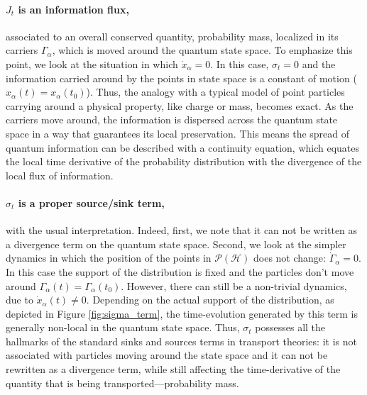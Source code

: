\documentclass[%
 reprint,
 superscriptaddress,
 aps,
 pra,
]{revtex4-2}
\newcommand{\PH}{\mathcal{P}(\mathcal{H})}
\theoremstyle{definition}
\begin{document}
\paragraph*{$J_t$ is an information flux,} associated to an overall conserved quantity, probability mass, localized in its carriers $\Gamma_\alpha$, which 
is moved around the quantum state space. To emphasize this point, we look at the situation in which $\dot{x}_\alpha = 0$. 
In this case, $\sigma_t=0$ and the information carried around by the points in state space is a constant of motion 
($x_\alpha(t)= x_\alpha(t_0)$). Thus, the analogy with a typical model of point particles carrying around a physical property, 
like charge or mass, becomes exact. As the carriers move around, the information is dispersed across the quantum 
state space in a way that guarantees its local preservation. This means the spread of quantum information can be described 
with a continuity equation, which equates the local time derivative of the probability distribution with the divergence of the 
local flux of information.

\paragraph*{$\sigma_t$ is a proper source/sink term,} with the usual interpretation. Indeed, first, we note that it
can not be written as a divergence term on the quantum state space. Second, we look at the simpler dynamics in 
which the position of the points in $\PH$ does not change: $\dot{\Gamma}_\alpha = 0$. In this case the support 
of the distribution is fixed and the particles don't move around $\Gamma_\alpha(t)=\Gamma_\alpha(t_0)$. However, 
there can still be a non-trivial dynamics, due to $\dot{x}_\alpha(t)\neq 0$. Depending on the actual support of 
the distribution, as depicted in Figure \ref{fig:sigma_term}, the time-evolution generated by this term is generally non-local in the 
quantum state space. Thus, $\sigma_t$ possesses all the hallmarks of the standard sinks and sources terms in 
transport theories: it is not associated with particles moving around the state space and it can not be rewritten 
as a divergence term, while still affecting the time-derivative of the quantity that is being transported---probability mass.
\end{document}
